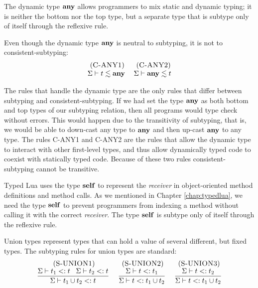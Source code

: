The dynamic type $\mathbf{any}$ allows programmers to mix static and dynamic typing;
it is neither the bottom nor the top type,
but a separate type that is subtype only of itself through the reflexive rule.

Even though the dynamic type $\mathbf{any}$ is neutral to subtyping,
it is not to consistent-subtyping:
\[
\begin{array}{c}
\begin{array}{c}
\; (\textsc{C-ANY1})\\
\Sigma \vdash t \lesssim \mathbf{any}
\end{array}
\;
\begin{array}{c}
\; (\textsc{C-ANY2})\\
\Sigma \vdash \mathbf{any} \lesssim t
\end{array}
\end{array}
\]

The rules that handle the dynamic type are the only rules that
differ between subtyping and consistent-subtyping.
If we had set the type $\mathbf{any}$ as both bottom and top types of our
subtyping relation, then all programs would type check without errors.
This would happen due to the transitivity of subtyping, that is,
we would be able to down-cast any type to $\mathbf{any}$ and then up-cast
$\mathbf{any}$ to any type.
The rules \textsc{C-ANY1} and \textsc{C-ANY2} are the rules that
allow the dynamic type to interact with other first-level types,
and thus allow dynamically typed code to coexist with statically
typed code.
Because of these two rules consistent-subtyping cannot be transitive.

Typed Lua uses the type $\mathbf{self}$ to represent the \emph{receiver}
in object-oriented method definitions and method calls.
As we mentioned in Chapter \ref{chap:typedlua}, we need the type
$\mathbf{self}$ to prevent programmers from indexing a method without
calling it with the correct \emph{receiver}.
The type $\mathbf{self}$ is subtype only of itself through the reflexive rule.

Union types represent types that can hold a value of several
different, but fixed types.
The subtyping rules for union types are standard:
\[
\begin{array}{c}
\begin{array}{c}
\; (\textsc{S-UNION1})\\
\dfrac{\Sigma \vdash t_{1} <: t \;\;\;
       \Sigma \vdash t_{2} <: t}
      {\Sigma \vdash t_{1} \cup t_{2} <: t}
\end{array}
\;
\begin{array}{c}
\; (\textsc{S-UNION2})\\
\dfrac{\Sigma \vdash t <: t_{1}}
      {\Sigma \vdash t <: t_{1} \cup t_{2}}
\end{array}
\;
\begin{array}{c}
\; (\textsc{S-UNION3})\\
\dfrac{\Sigma \vdash t <: t_{2}}
      {\Sigma \vdash t <: t_{1} \cup t_{2}}
\end{array}
\end{array}
\]

